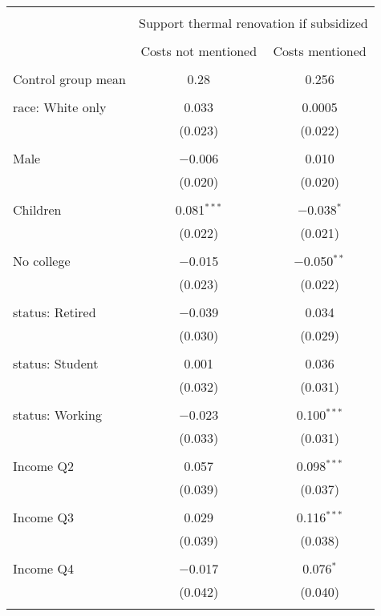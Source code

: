 
\begin{tabular}{@{\extracolsep{5pt}}lcc} 
\\[-1.8ex]\hline 
\hline \\[-1.8ex] 
 & \multicolumn{2}{c}{Support thermal renovation if subsidized} \\ 
\cline{2-3} 
\\[-1.8ex] & Costs not mentioned & Costs mentioned \\ 
\hline \\[-1.8ex] 
 Control group mean & 0.28 & 0.256  \\ \hline \\[-1.8ex] race: White only & 0.033 & 0.0005 \\ 
  & (0.023) & (0.022) \\ 
  & & \\ 
 Male & $-$0.006 & 0.010 \\ 
  & (0.020) & (0.020) \\ 
  & & \\ 
 Children & 0.081$^{***}$ & $-$0.038$^{*}$ \\ 
  & (0.022) & (0.021) \\ 
  & & \\ 
 No college & $-$0.015 & $-$0.050$^{**}$ \\ 
  & (0.023) & (0.022) \\ 
  & & \\ 
 status: Retired & $-$0.039 & 0.034 \\ 
  & (0.030) & (0.029) \\ 
  & & \\ 
 status: Student & 0.001 & 0.036 \\ 
  & (0.032) & (0.031) \\ 
  & & \\ 
 status: Working & $-$0.023 & 0.100$^{***}$ \\ 
  & (0.033) & (0.031) \\ 
  & & \\ 
 Income Q2 & 0.057 & 0.098$^{***}$ \\ 
  & (0.039) & (0.037) \\ 
  & & \\ 
 Income Q3 & 0.029 & 0.116$^{***}$ \\ 
  & (0.039) & (0.038) \\ 
  & & \\ 
 Income Q4 & $-$0.017 & 0.076$^{*}$ \\ 
  & (0.042) & (0.040) \\ 
  & & \\ 

\end{tabular}
